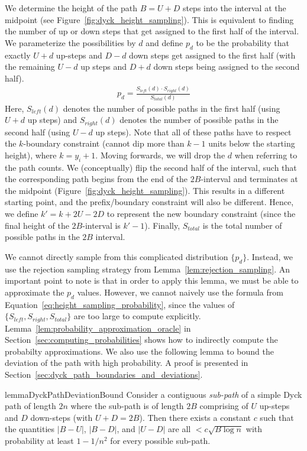 We determine the height of the path $B = U+D$ steps into the interval at the midpoint (see Figure~\ref{fig:dyck_height_sampling}).
This is equivalent to finding the number of up or down steps that get assigned to the first half of the interval.
We parameterize the possibilities by $d$ and define $p_d$ to be the probability that exactly $U+d$ up-steps and $D-d$ down steps
get assigned to the first half (with the remaining $U-d$ up steps and $D+d$ down steps being assigned to the second half).
\begin{align}
\label{eq:height_sampling_probability}
p_d = \frac{S_{left}(d)\cdot S_{right}(d)}{S_{total}(d)}
\end{align}
Here, $S_{left}(d)$ denotes the number of possible paths in the first half (using $U+d$ up steps)
and $S_{right}(d)$ denotes the number of possible paths in the second half (using $U-d$ up steps).
Note that all of these paths have to respect the $k$-boundary constraint (cannot dip more than $k-1$ units below the starting height), where $k=y_i+1$.
Moving forwards, we will drop the $d$ when referring to the path counts.
We (conceptually) flip the second half of the interval,
such that the corresponding path begins from the end of the $2B$-interval and terminates at the midpoint (Figure~\ref{fig:dyck_height_sampling}).
This results in a different starting point, and the prefix/boundary constraint will also be different.
Hence, we define $k' = k + 2U - 2D$  to represent the new boundary constraint (since the final height of the $2B$-interval is $k'-1$).
Finally, $S_{total}$ is the total number of possible paths in the $2B$ interval.

We cannot directly sample from this complicated distribution $\{ p_d\}$.
Instead, we use the rejection sampling strategy from Lemma~\ref{lem:rejection_sampling}.
An important point to note is that in order to apply this lemma, we must be able to approximate the $p_d$ values.
However, we cannot naively use the formula from Equation~\ref{eq:height_sampling_probability},
since the values of $\{ S_{left},S_{right},S_{total}\}$ are too large to compute explicitly.
Lemma~\ref{lem:probability_approximation_oracle} in Section~\ref{sec:computing_probabilities}
shows how to indirectly compute the probabilty approximations.
We also use the following lemma to bound the deviation of the path with high probability.
A proof is presented in Section~\ref{sec:dyck_path_boundaries_and_deviations}.
\begin{restatable}{lemma}{DyckPathDeviationBound}
\label{lem:DyckPathDeviationBound}
Consider a contiguous \emph{sub-path} of a simple Dyck path of length $2n$
where the sub-path is of length $2B$ comprising of $U$ up-steps and $D$ down-steps (with $U + D = 2B$).
Then there exists a constant $c$ such that the quantities $|B-U|$, $|B-D|$, and $|U-D|$
are all $<c\sqrt{B\log n}$ with probability at least $1-1/n^2$ for every possible sub-path.
\end{restatable}

